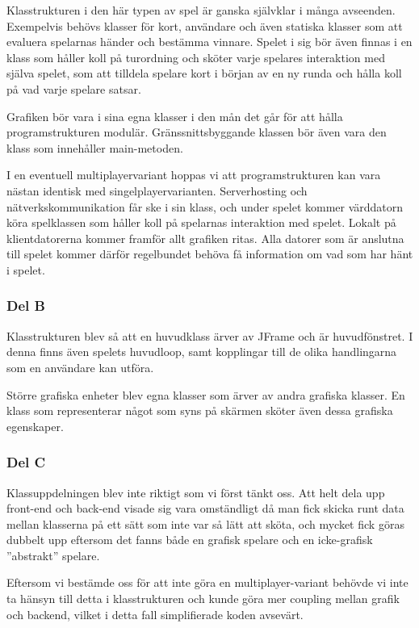 \documentclass[10pt,a4paper]{article}
\begin{document}
Klasstrukturen i den här typen av spel är ganska självklar i många
avseenden. Exempelvis behövs klasser för kort, användare och även statiska
klasser som att evaluera spelarnas händer och bestämma vinnare. Spelet i
sig bör även finnas i en klass som håller koll på turordning och sköter
varje spelares interaktion med själva spelet, som att tilldela spelare kort
i början av en ny runda och hålla koll på vad varje spelare satsar.

Grafiken bör vara i sina egna klasser i den mån det går för att hålla
programstrukturen modulär. Gränssnittsbyggande klassen bör även vara den
klass som innehåller main-metoden.

I en eventuell multiplayervariant hoppas vi att programstrukturen kan vara
nästan identisk med singelplayervarianten. Serverhosting och
nätverkskommunikation får ske i sin klass, och under spelet kommer
värddatorn köra spelklassen som håller koll på spelarnas interaktion med
spelet. Lokalt på klientdatorerna kommer framför allt grafiken ritas. Alla
datorer som är anslutna till spelet kommer därför regelbundet behöva få
information om vad som har hänt i spelet.

\subsubsection*{Del B}

Klasstrukturen blev så att en huvudklass ärver av JFrame och är
huvudfönstret. I denna finns även spelets huvudloop, samt kopplingar till
de olika handlingarna som en användare kan utföra.

Större grafiska enheter blev egna klasser som ärver av andra grafiska
klasser. En klass som representerar något som syns på skärmen sköter även
dessa grafiska egenskaper.

\subsubsection*{Del C}

Klassuppdelningen blev inte riktigt som vi först tänkt oss. Att helt dela
upp front-end och back-end visade sig vara omständligt då man fick skicka
runt data mellan klasserna på ett sätt som inte var så lätt att sköta, och
mycket fick göras dubbelt upp eftersom det fanns både en grafisk spelare
och en icke-grafisk ''abstrakt'' spelare.

Eftersom vi bestämde oss för att inte göra en multiplayer-variant behövde
vi inte ta hänsyn till detta i klasstrukturen och kunde göra mer coupling
mellan grafik och backend, vilket i detta fall simplifierade koden
avsevärt.
\end{document}
